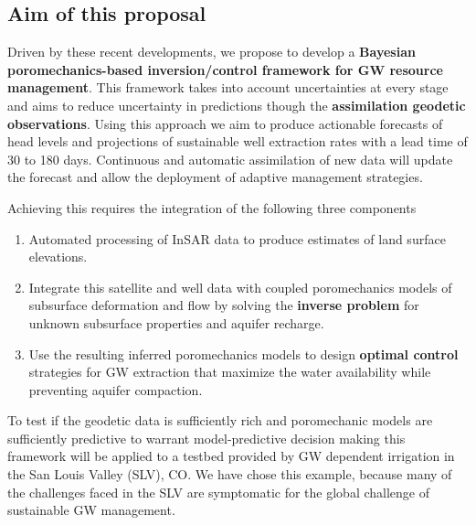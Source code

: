 \documentclass[11pt,final]{article}%
\def\squeeze{\parskip=0pt\itemsep=0pt}
\let\itemOld=\item
\def\item{\squeeze\itemOld}
\begin{document}

\subsection{Aim of this proposal}
Driven  by these recent developments, we propose to develop a \textbf{Bayesian poromechanics-based inversion/control framework for GW resource management}. This framework takes into account uncertainties at every stage and aims to reduce uncertainty in predictions though the \textbf{assimilation geodetic observations}.  Using this approach we aim to produce actionable forecasts of head levels and projections of sustainable well extraction rates with a lead time of 30 to 180 days. Continuous and automatic assimilation of new data will update the forecast and allow the deployment of adaptive management strategies. 

Achieving this requires the integration of the following three components
\begin{enumerate}
    \item Automated processing of InSAR data to produce estimates of land surface elevations.
    \item Integrate this satellite and well data with coupled poromechanics models of subsurface deformation and flow by solving the {\bf inverse problem} for unknown subsurface properties and aquifer recharge.
    \item Use the resulting inferred poromechanics models to design {\bf optimal control} strategies for GW extraction that maximize the water availability while preventing aquifer compaction. 
\end{enumerate}

To test if the geodetic data is sufficiently rich and poromechanic models are sufficiently predictive to warrant model-predictive decision making this framework will be applied to a testbed provided by GW dependent irrigation in the San Louis Valley (SLV), CO. We have chose this example, because many of the challenges faced in the SLV are symptomatic for the global challenge of sustainable GW management.
\end{document}
